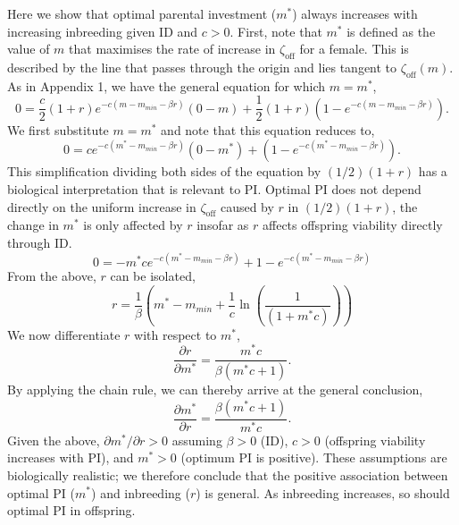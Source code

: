 \documentclass[10pt,letterpaper]{article}
\begin{document}
Here we show that optimal parental investment ($m^{*}$) always increases with increasing inbreeding given ID and $c>0$. First, note that $m^{*}$ is defined as the value of $m$ that maximises the rate of increase in $\zeta_{\textrm{off}}$ for a female. This is described by the line that passes through the origin and lies tangent to $\zeta_{\textrm{off}}(m)$. As in Appendix 1, we have the general equation for which $m=m^{*}$,
\begin{equation}
0 = \frac{c}{2} \left(1+r\right)e^{-c\left(m-m_{min}-\beta r\right)}\left(0-m\right) + \frac{1}{2}\left(1+r\right)\left(1-e^{-c\left(m-m_{min}-\beta r\right)}\right).
\end{equation}
We first substitute $m=m^{*}$ and note that this equation reduces to,
\begin{equation}
0 = c e^{-c\left(m^{*}-m_{min}-\beta r\right)}\left(0-m^{*}\right) + \left(1-e^{-c\left(m^{*}-m_{min}-\beta r\right)}\right). 
\end{equation}
This simplification dividing both sides of the equation by $(1/2)(1+r)$ has a biological interpretation that is relevant to PI. Optimal PI does not depend directly on the uniform increase in $\zeta_{\textrm{off}}$ caused by $r$ in $(1/2)(1+r)$, the change in $m^{*}$ is only affected by $r$ insofar as $r$ affects offspring viability directly through ID. %
\begin{equation}
0 = -m^{*} c e^{-c\left(m^{*}-m_{min}-\beta r\right)} + 1-e^{-c\left(m^{*}-m_{min}-\beta r\right)}
\end{equation}
From the above, $r$ can be isolated,
\begin{equation}
r = \frac{1}{\beta}\left(m^{*} - m_{min} + \frac{1}{c}\ln\left(\frac{1}{\left(1 + m^{*} c\right)}\right)\right)
\end{equation}
We now differentiate $r$ with respect to $m^{*}$,
\begin{equation}
\frac{\partial r}{\partial m^{*}} = \frac{m^{*} c}{\beta \left(m^{*} c + 1\right)}. 
\end{equation}
By applying the chain rule, we can thereby arrive at the general conclusion,
\begin{equation}
\frac{\partial m^{*}}{\partial r} = \frac{\beta \left(m^{*} c + 1\right)}{m^{*} c}. 
\end{equation} 
Given the above, $\partial m^{*} / \partial r > 0$ assuming $\beta>0$ (ID), $c>0$ (offspring viability increases with PI), and $m^{*}>0$ (optimum PI is positive). These assumptions are biologically realistic; we therefore conclude that the positive association between optimal PI ($m^{*}$) and inbreeding ($r$) is general. As inbreeding increases, so should optimal PI in offspring.
\end{document}
